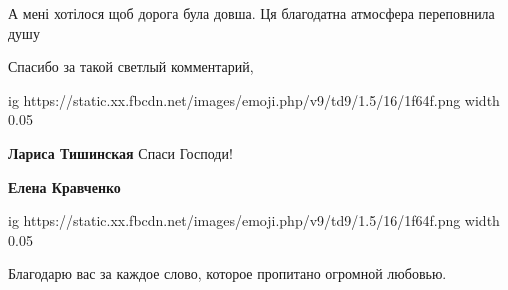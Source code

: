 \begin{itemize}
\begin{itemize}
 
А мені хотілося щоб дорога була довша. Ця благодатна атмосфера переповнила душу
\end{itemize}

 
Спасибо за такой светлый комментарий, 

\ifcmt
  ig https://static.xx.fbcdn.net/images/emoji.php/v9/td9/1.5/16/1f64f.png
  width 0.05
\fi

\begin{itemize}
 
\textbf{Лариса Тишинская} Спаси Господи!

 
\textbf{Елена Кравченко} 

\ifcmt
  ig https://static.xx.fbcdn.net/images/emoji.php/v9/td9/1.5/16/1f64f.png
  width 0.05
\fi

\end{itemize}

 
Благодарю вас за каждое слово, которое пропитано огромной любовью.

 

\end{itemize}
